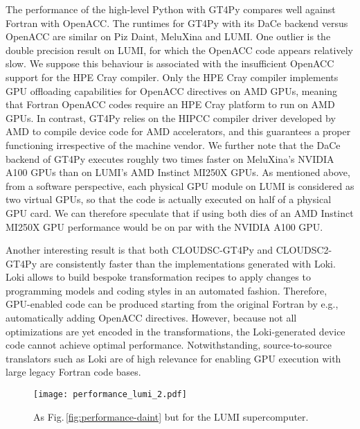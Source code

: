 \documentclass[main.tex]{subfiles}
\begin{document}
        The performance of the high-level Python with GT4Py compares well against Fortran with OpenACC. The runtimes for GT4Py with its DaCe backend versus OpenACC are similar on Piz Daint, MeluXina and LUMI. One outlier is the double precision result on LUMI, for which the OpenACC code appears relatively slow. We suppose this behaviour is associated with the insufficient OpenACC support for the HPE Cray compiler. Only the HPE Cray compiler implements GPU offloading capabilities for OpenACC directives on AMD GPUs, meaning that Fortran OpenACC codes require an HPE Cray platform to run on AMD GPUs. In contrast, GT4Py relies on the HIPCC compiler driver developed by AMD to compile device code for AMD accelerators, and this guarantees a proper functioning irrespective of the machine vendor. We further note that the DaCe backend of GT4Py executes roughly two times faster on MeluXina's NVIDIA A100 GPUs than on LUMI's AMD Instinct MI250X GPUs. As mentioned above, from a software perspective, each physical GPU module on LUMI is considered as two virtual GPUs, so that the code is actually executed on half of a physical GPU card. We can therefore speculate that if using both dies of an AMD Instinct MI250X GPU performance would be on par with the NVIDIA A100 GPU.

        Another interesting result is that both CLOUDSC-GT4Py and CLOUDSC2-GT4Py are consistently faster than the implementations generated with Loki. Loki allows to build bespoke transformation recipes to apply changes to programming models and coding styles in an automated fashion. Therefore, GPU-enabled code can be produced starting from the original Fortran by e.g., automatically adding OpenACC directives. However, because not all optimizations are yet encoded in the transformations, the Loki-generated device code cannot achieve optimal performance. Notwithstanding, source-to-source translators such as Loki are of high relevance for enabling GPU execution with large legacy Fortran code bases.

        \begin{figure}[t!]
            \centering
            \texttt{[image: performance\_lumi\_2.pdf]}
            \caption{As Fig.\,\ref{fig:performance-daint} but for the LUMI supercomputer.}
            \label{fig:performance-lumi}
        \end{figure}
        
\end{document}

